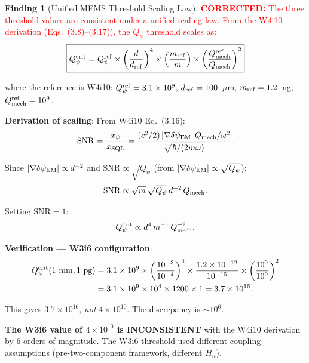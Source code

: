 \documentclass[11pt]{article}
\newcommand{\ee}[1]{\times 10^{#1}}
\newcommand{\Qpsi}{Q_\psi}
\newcommand{\SNR}{\mathrm{SNR}}
\newcommand{\Heff}{H_n}
\newcommand{\dpsiEM}{\delta\psi_{\rm EM}}
\newcommand{\corrected}[1]{\textcolor{red}{\textbf{CORRECTED:} #1}}
\theoremstyle{definition}
\newtheorem{finding}[theorem]{Finding}
\theoremstyle{remark}
\begin{document}
\begin{finding}[Unified MEMS Threshold Scaling Law]
\label{find:scaling}
\corrected{The three threshold values are consistent under a unified
scaling law. From the W4i10 derivation (Eqs.~(3.8)--(3.17)), the
$\Qpsi$ threshold scales as:}
\begin{equation}
\boxed{
\Qpsi^{\rm crit} = \Qpsi^{\rm ref}\times
\left(\frac{d}{d_{\rm ref}}\right)^4\times
\left(\frac{m_{\rm ref}}{m}\right)\times
\left(\frac{Q_{\rm mech}^{\rm ref}}{Q_{\rm mech}}\right)^2
}
\label{eq:scaling_law}
\end{equation}

where the reference is W4i10: $\Qpsi^{\rm ref} = 3.1\ee{9}$,
$d_{\rm ref} = 100$~$\mu$m, $m_{\rm ref} = 1.2$~ng,
$Q_{\rm mech}^{\rm ref} = 10^9$.

\textbf{Derivation of scaling}: From W4i10 Eq.~(3.16):
\begin{equation}
\SNR = \frac{x_\psi}{x_{\rm SQL}}
= \frac{(c^2/2)\,|\nabla\dpsiEM|\,Q_{\rm mech}/\omega^2}
{\sqrt{\hbar/(2m\omega)}}.
\label{eq:SNR_full}
\end{equation}

Since $|\nabla\dpsiEM| \propto d^{-2}$ and $\SNR \propto \sqrt{\Qpsi}$
(from $|\nabla\dpsiEM| \propto \sqrt{\Qpsi}$):
\begin{equation}
\SNR \propto \sqrt{m}\,\sqrt{\Qpsi}\,d^{-2}\,Q_{\rm mech}.
\end{equation}

Setting $\SNR = 1$:
\begin{equation}
\Qpsi^{\rm crit} \propto d^4\,m^{-1}\,Q_{\rm mech}^{-2}.
\end{equation}

\textbf{Verification --- W3i6 configuration}:
\begin{align}
\Qpsi^{\rm crit}(1\text{~mm}, 1\text{~pg})
&= 3.1\ee{9}\times\left(\frac{10^{-3}}{10^{-4}}\right)^4\times
\frac{1.2\ee{-12}}{10^{-15}}\times\left(\frac{10^9}{10^9}\right)^2
\nonumber\\
&= 3.1\ee{9}\times 10^4\times 1200\times 1
= 3.7\ee{16}.
\label{eq:verify_W3i6}
\end{align}

This gives $3.7\ee{16}$, \emph{not} $4\ee{10}$. The discrepancy is
$\sim 10^6$.

\textbf{The W3i6 value of $4\ee{10}$ is INCONSISTENT} with the W4i10
derivation by 6 orders of magnitude. The W3i6 threshold used different
coupling assumptions (pre-two-component framework, different $\Heff$).


\end{finding}
\end{document}
